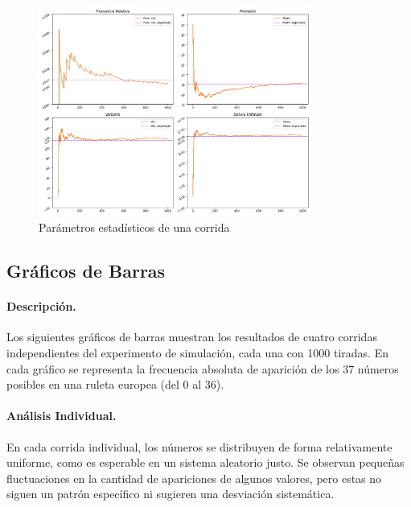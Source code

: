 \documentclass{article}
\begin{document}
\begin{figure}[H]
    \centering
    \includegraphics[width=0.8\textwidth]{Imagenes/ParametrosCorrida_4.png}
    \caption{Parámetros estadísticos de una corrida}
    \label{fig:ParametrosCorridas}
\end{figure}

\subsection{Gráficos de Barras} 
\paragraph{Descripción.} 
 Los siguientes gráficos de barras muestran los resultados de cuatro corridas independientes del experimento de simulación, cada una con 1000 tiradas. En cada gráfico se representa la frecuencia absoluta de aparición de los 37 números posibles en una ruleta europea (del 0 al 36).

\paragraph{Análisis Individual.} En cada corrida individual, los números se distribuyen de forma relativamente uniforme, como es esperable en un sistema aleatorio justo. Se observan pequeñas fluctuaciones en la cantidad de apariciones de algunos valores, pero estas no siguen un patrón específico ni sugieren una desviación sistemática.
\end{document}
